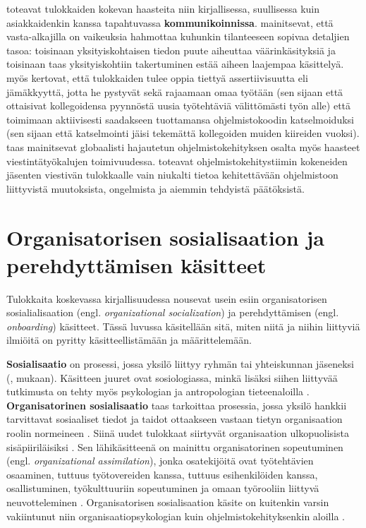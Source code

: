 \documentclass[utf8]{gradu3}
\begin{document}
\textcite{radermacher-ym-2015} toteavat tulokkaiden kokevan haasteita niin kirjallisessa, suullisessa kuin asiakkaidenkin kanssa tapahtuvassa \textbf{kommunikoinnissa}. \textcite{begel-simon-2008} mainitsevat, että vasta-alkajilla on vaikeuksia hahmottaa kuhunkin tilanteeseen sopivaa detaljien tasoa: toisinaan yksityiskohtaisen tiedon puute aiheuttaa väärinkäsityksiä ja toisinaan taas yksityiskohtiin takertuminen estää aiheen laajempaa käsittelyä. \textcite{begel-simon-2008} myös kertovat, että tulokkaiden tulee oppia tiettyä assertiivisuutta eli jämäkkyyttä, jotta he pystyvät sekä rajaamaan omaa työtään (sen sijaan että ottaisivat kollegoidensa pyynnöstä uusia työtehtäviä välittömästi työn alle) että toimimaan aktiivisesti saadakseen tuottamansa ohjelmistokoodin katselmoiduksi (sen sijaan että katselmointi jäisi tekemättä kollegoiden muiden kiireiden vuoksi). \textcite{moe-ym-2020} taas mainitsevat globaalisti hajautetun ohjelmistokehityksen osalta myös haasteet viestintätyökalujen toimivuudessa. \textcite{matturro-ym-2017} toteavat ohjelmistokehitystiimin kokeneiden jäsenten viestivän tulokkaalle vain niukalti tietoa kehitettävään ohjelmistoon liittyvistä muutoksista, ongelmista ja aiemmin tehdyistä päätöksistä.



\section{Organisatorisen sosialisaation ja perehdyttämisen käsitteet}
\label{luku-organisatorinen-sosialisaatio-ja-perehdyttäminen}

Tulokkaita koskevassa kirjallisuudessa nousevat usein esiin organisatorisen sosialialisaation (engl. \textit{organizational socialization}) ja perehdyttämisen (engl. \textit{onboarding}) käsitteet. Tässä luvussa käsitellään sitä, miten niitä ja niihin liittyviä ilmiöitä on pyritty käsitteellistämään ja määrittelemään.

\textbf{Sosialisaatio} on prosessi, jossa yksilö liittyy ryhmän tai yhteiskunnan jäseneksi (\textcite{brim-1966}, \textcite{chao-2012} mukaan). Käsitteen juuret ovat sosiologiassa, minkä lisäksi siihen liittyvää tutkimusta on tehty myös psykologian ja antropologian tieteenaloilla \parencite{chao-2012}. \textbf{Organisatorinen sosialisaatio} taas tarkoittaa prosessia, jossa yksilö hankkii tarvittavat sosiaaliset tiedot ja taidot ottaakseen vastaan tietyn organisaation roolin normeineen \parencite{van-maanen-schein-1979}. Siinä uudet tulokkaat siirtyvät organisaation ulkopuolisista sisäpiiriläisiksi \parencite{bauer-ym-2007}. Sen lähikäsitteenä on mainittu organisatorinen sopeutuminen (engl. \textit{organizational assimilation}), jonka osatekijöitä ovat työtehtävien osaaminen, tuttuus työtovereiden kanssa, tuttuus esihenkilöiden kanssa, osallistuminen, työkulttuuriin sopeutuminen ja omaan työrooliin liittyvä neuvotteleminen \parencite{gailliard-ym-2010}. Organisatorisen sosialisaation käsite on kuitenkin varsin vakiintunut niin organisaatiopsykologian kuin ohjelmistokehityksenkin aloilla %
\parencites%
[ks. esim.][]{van-maanen-schein-1979}%
{bauer-2010}%
{bauer-erdogan-2012}%
{saks-gruman-2012}%
{sharma-stol-2019}%
{britto-ym-2017}%
{johnson-senges-2010}%
\relax.
%
\end{document}
